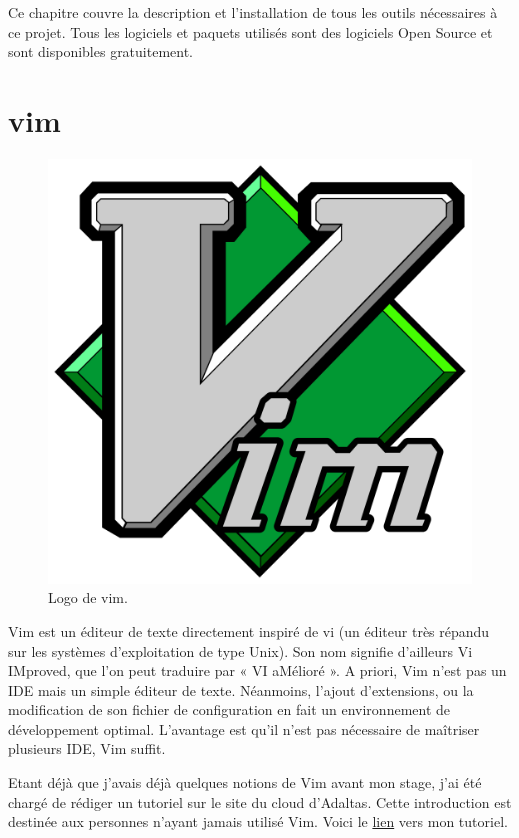 \documentclass[12pt, french]{report}
\begin{document}
Ce chapitre couvre la description et l'installation de tous les outils nécessaires à ce projet. Tous les logiciels et paquets utilisés sont des logiciels Open Source et sont disponibles gratuitement.

\section{vim}

\begin{figure}[h]
\includegraphics[scale=0.1]{assets/img/logo-vim.png}
\centering
\caption{Logo de vim.}
\label{fig:logo-adaltas}
\end{figure}

Vim est un éditeur de texte directement inspiré de vi (un éditeur très répandu sur les systèmes d’exploitation de type Unix). Son nom signifie d’ailleurs Vi IMproved, que l’on peut traduire par « VI aMélioré ». A priori, Vim n'est pas un IDE mais un simple éditeur de texte. Néanmoins, l'ajout  d'extensions, ou la modification de son fichier de configuration en fait un environnement de développement optimal. L'avantage est qu'il n'est pas nécessaire de maîtriser plusieurs IDE, Vim suffit.

Etant déjà que j'avais déjà quelques notions de Vim avant mon stage, j'ai été chargé de rédiger un tutoriel sur le site du cloud d'Adaltas. Cette introduction est destinée aux personnes n'ayant jamais utilisé Vim. Voici le \href{https://www.adaltas.cloud/en/docs/foundations/vim/}{lien} vers mon tutoriel.
\end{document}
